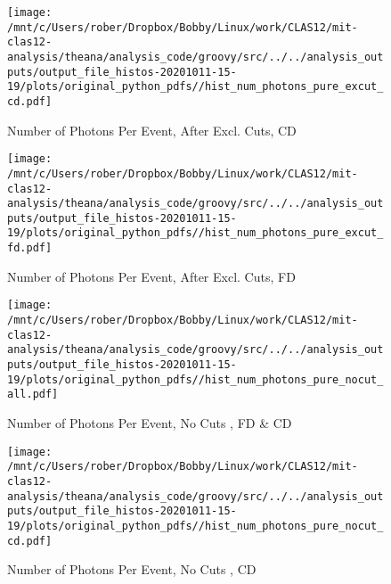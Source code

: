 \documentclass{article}
\begin{document}
\begin{landscape}
    \begin{figure}[h]
        \centering

        \texttt{[image: /mnt/c/Users/rober/Dropbox/Bobby/Linux/work/CLAS12/mit-clas12-analysis/theana/analysis\_code/groovy/src/../../analysis\_outputs/output\_file\_histos-20201011-15-19/plots/original\_python\_pdfs//hist\_num\_photons\_pure\_excut\_cd.pdf]}
        \captionsetup{textformat=empty,labelformat=blank}
        \caption{Number of Photons Per Event, After Excl. Cuts, CD}
    \end{figure}
    \clearpage
    
    \begin{figure}[h]
        \centering

        \texttt{[image: /mnt/c/Users/rober/Dropbox/Bobby/Linux/work/CLAS12/mit-clas12-analysis/theana/analysis\_code/groovy/src/../../analysis\_outputs/output\_file\_histos-20201011-15-19/plots/original\_python\_pdfs//hist\_num\_photons\_pure\_excut\_fd.pdf]}
        \captionsetup{textformat=empty,labelformat=blank}
        \caption{Number of Photons Per Event, After Excl. Cuts, FD}
    \end{figure}
    \clearpage
    
    \begin{figure}[h]
        \centering

        \texttt{[image: /mnt/c/Users/rober/Dropbox/Bobby/Linux/work/CLAS12/mit-clas12-analysis/theana/analysis\_code/groovy/src/../../analysis\_outputs/output\_file\_histos-20201011-15-19/plots/original\_python\_pdfs//hist\_num\_photons\_pure\_nocut\_all.pdf]}
        \captionsetup{textformat=empty,labelformat=blank}
        \caption{Number of Photons Per Event, No Cuts , FD \& CD}
    \end{figure}
    \clearpage
    
    \begin{figure}[h]
        \centering

        \texttt{[image: /mnt/c/Users/rober/Dropbox/Bobby/Linux/work/CLAS12/mit-clas12-analysis/theana/analysis\_code/groovy/src/../../analysis\_outputs/output\_file\_histos-20201011-15-19/plots/original\_python\_pdfs//hist\_num\_photons\_pure\_nocut\_cd.pdf]}
        \captionsetup{textformat=empty,labelformat=blank}
        \caption{Number of Photons Per Event, No Cuts , CD}
    \end{figure}
    \clearpage
    
    \begin{figure}[h]
        \centering


\end{figure}
\end{landscape}
\end{document}
